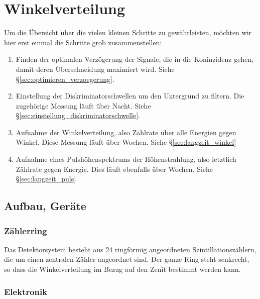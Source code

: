\documentclass[11pt, ngerman, fleqn, DIV=15, headinclude, BCOR=2cm]{scrreprt}
\begin{document}

\chapter{Winkelverteilung}

Um die Übersicht über die vielen kleinen Schritte zu gewährleisten, möchten wir
hier erst einmal die Schritte grob zusammenstellen:

\begin{enumerate}
    \item
        Finden der optimalen Verzögerung der Signale, die in die Koninzidenz
        gehen, damit deren Überschneidung maximiert wird. Siehe
        §\ref{sec:optimieren_verzoegerung}.

    \item
        Einstellung der Diskriminatorschwellen um den Untergrund zu filtern.
        Die zugehörige Messung läuft über Nacht. Siehe
        §\ref{sec:einstellung_diskriminatorschwelle}.

    \item
        Aufnahme der Winkelverteilung, also Zählrate über alle Energien gegen
        Winkel. Diese Messung läuft über Wochen. Siehe
        §\ref{sec:langzeit_winkel}
        
    \item
        Aufnahme eines Pulshöhenspektrums der Höhenstrahlung, also letztlich
        Zählrate gegen Energie. Dies läuft ebenfalls über Wochen. Siehe
        §\ref{sec:langzeit_puls}
\end{enumerate}

\section{Aufbau, Geräte}

\subsection{Zählerring}

Das Detektorsystem besteht aus 24 ringförmig angeordneten
Szintillationszählern, die um einen zentralen Zähler angeordnet sind. Der ganze
Ring steht senkrecht, so dass die Winkelverteilung im Bezug auf den Zenit
bestimmt werden kann.


\subsection{Elektronik}
\end{document}
